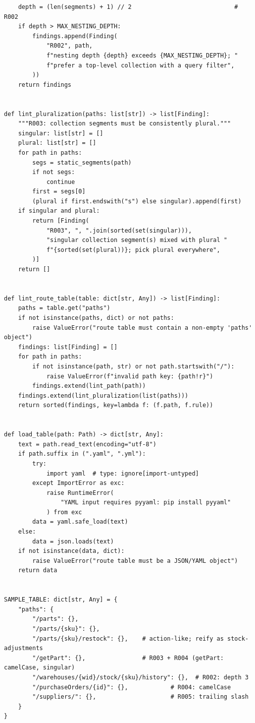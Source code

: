 \begin{verbatim}
    depth = (len(segments) + 1) // 2                             # R002
    if depth > MAX_NESTING_DEPTH:
        findings.append(Finding(
            "R002", path,
            f"nesting depth {depth} exceeds {MAX_NESTING_DEPTH}; "
            f"prefer a top-level collection with a query filter",
        ))
    return findings


def lint_pluralization(paths: list[str]) -> list[Finding]:
    """R003: collection segments must be consistently plural."""
    singular: list[str] = []
    plural: list[str] = []
    for path in paths:
        segs = static_segments(path)
        if not segs:
            continue
        first = segs[0]
        (plural if first.endswith("s") else singular).append(first)
    if singular and plural:
        return [Finding(
            "R003", ", ".join(sorted(set(singular))),
            "singular collection segment(s) mixed with plural "
            f"{sorted(set(plural))}; pick plural everywhere",
        )]
    return []


def lint_route_table(table: dict[str, Any]) -> list[Finding]:
    paths = table.get("paths")
    if not isinstance(paths, dict) or not paths:
        raise ValueError("route table must contain a non-empty 'paths' object")
    findings: list[Finding] = []
    for path in paths:
        if not isinstance(path, str) or not path.startswith("/"):
            raise ValueError(f"invalid path key: {path!r}")
        findings.extend(lint_path(path))
    findings.extend(lint_pluralization(list(paths)))
    return sorted(findings, key=lambda f: (f.path, f.rule))


def load_table(path: Path) -> dict[str, Any]:
    text = path.read_text(encoding="utf-8")
    if path.suffix in (".yaml", ".yml"):
        try:
            import yaml  # type: ignore[import-untyped]
        except ImportError as exc:
            raise RuntimeError(
                "YAML input requires pyyaml: pip install pyyaml"
            ) from exc
        data = yaml.safe_load(text)
    else:
        data = json.loads(text)
    if not isinstance(data, dict):
        raise ValueError("route table must be a JSON/YAML object")
    return data


SAMPLE_TABLE: dict[str, Any] = {
    "paths": {
        "/parts": {},
        "/parts/{sku}": {},
        "/parts/{sku}/restock": {},    # action-like; reify as stock-adjustments
        "/getPart": {},                # R003 + R004 (getPart: camelCase, singular)
        "/warehouses/{wid}/stock/{sku}/history": {},  # R002: depth 3
        "/purchaseOrders/{id}": {},            # R004: camelCase
        "/suppliers/": {},                     # R005: trailing slash
    }
}



\end{verbatim}
